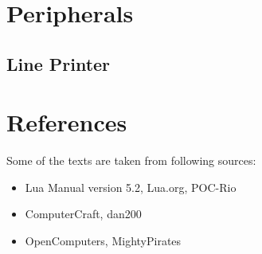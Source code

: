 \documentclass[10pt, stock]{memoir}
\let\oldsection\section
\renewcommand\section{\clearpage\oldsection}
\begin{document}
\chapter{Peripherals}

\section{Line Printer}




\chapter{References}

Some of the texts are taken from following sources:

\begin{itemize}
\item Lua Manual version 5.2, Lua.org, POC-Rio
\item ComputerCraft, dan200
\item OpenComputers, MightyPirates
\end{itemize}

\afterpage{\pagestyle{empty}\null\newpage}
\end{document}
